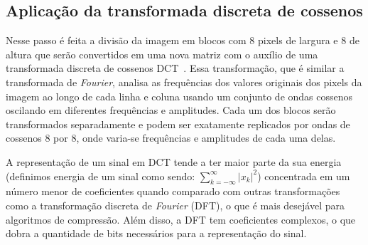 
\subsection{Aplicação da transformada discreta de cossenos}
Nesse passo é feita a divisão da imagem em blocos com 8 pixels de largura e 8 de altura que serão convertidos em uma nova matriz com o auxílio de uma transformada discreta de cossenos \acrshort{DCT}~\cite{ahmed1974discrete}. Essa transformação, que é similar a transformada de \textit{Fourier}, analisa as frequências dos valores originais dos pixels da imagem ao longo de cada linha e coluna usando um conjunto de ondas cossenos oscilando em diferentes frequências e amplitudes. Cada um dos blocos serão transformados separadamente e podem ser exatamente replicados por ondas de cossenos 8 por 8, onde varia-se frequências e amplitudes de cada uma delas. 

A representação de um sinal em \acrshort{DCT} tende a ter maior parte da sua energia (definimos energia de um sinal como sendo: $\sum_{k = - \infty}^{\infty}{|x_k|}^2$) concentrada em um número menor de coeficientes quando comparado com outras transformações como a transformação discreta de \textit{Fourier} (\acrshort{DFT}), o que é mais desejável para algoritmos de compressão. Além disso, a \acrshort{DFT} tem coeficientes complexos, o que dobra a quantidade de bits necessários para a representação do sinal. 

